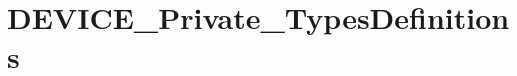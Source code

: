 \hypertarget{group___d_e_v_i_c_e___private___types_definitions}{}\section{D\+E\+V\+I\+C\+E\+\_\+\+Private\+\_\+\+Types\+Definitions}
\label{group___d_e_v_i_c_e___private___types_definitions}
